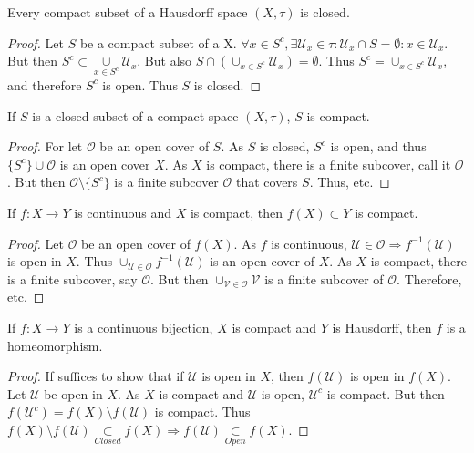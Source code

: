         \begin{theorem}
        Every compact subset of a Hausdorff space $(X,\tau)$ is closed.
        \end{theorem}
        \begin{proof}
        Let $S$ be a compact subset of a X. $\forall x\in S^c, \exists \mathcal{U}_x\in \tau:\mathcal{U}_x\cap S = \emptyset:x\in \mathcal{U}_x$. But then $S^c \subset \underset{x\in S^c}\cup\mathcal{U}_x$. But also $S\cap (\cup_{x\in S^c}\mathcal{U}_x) = \emptyset$. Thus $S^c = \cup_{x\in S^c}\mathcal{U}_x$, and therefore $S^c$ is open. Thus $S$ is closed.
        \end{proof}
        \begin{theorem}
        If $S$ is a closed subset of a compact space $(X,\tau)$, $S$ is compact.
        \end{theorem}
        \begin{proof}
        For let $\mathcal{O}$ be an open cover of $S$. As $S$ is closed, $S^c$ is open, and thus $\{S^c\} \cup \mathcal{O}$ is an open cover $X$. As $X$ is compact, there is a finite subcover, call it $\mathscr{O}$. But then $\mathscr{O}\setminus \{S^c\}$ is a finite subcover $\mathcal{O}$ that covers $S$. Thus, etc.
        \end{proof}
        \begin{theorem}
        If $f:X\rightarrow Y$ is continuous and $X$ is compact, then $f(X)\subset Y$ is compact.
        \end{theorem}
        \begin{proof}
        Let $\mathcal{O}$ be an open cover of $f(X)$. As $f$ is continuous, $\mathcal{U}\in\mathcal{O}\Rightarrow f^{-1}(\mathcal{U})$ is open in $X$. Thus $\cup_{\mathcal{U}\in \mathcal{O}} f^{-1}(\mathcal{U})$ is an open cover of $X$. As $X$ is compact, there is a finite subcover, say $\mathscr{O}$. But then $\cup_{\mathcal{V}\in \mathscr{O}} \mathcal{V}$ is a finite subcover of $\mathcal{O}$. Therefore, etc.
        \end{proof}
        \begin{theorem}
        If $f:X\rightarrow Y$ is a continuous bijection, $X$ is compact and $Y$ is Hausdorff, then $f$ is a homeomorphism.
        \end{theorem}
        \begin{proof}
        If suffices to show that if $\mathcal{U}$ is open in $X$, then $f(\mathcal{U})$ is open in $f(X)$. Let $\mathcal{U}$ be open in $X$. As $X$ is compact and $\mathcal{U}$ is open, $\mathcal{U}^c$ is compact. But then $f(\mathcal{U}^c) = f(X)\setminus f(\mathcal{U})$ is compact. Thus $f(X)\setminus f(\mathcal{U})\underset{Closed}\subset f(X)\Rightarrow f(\mathcal{U})\underset{Open}\subset f(X)$.
        \end{proof}

